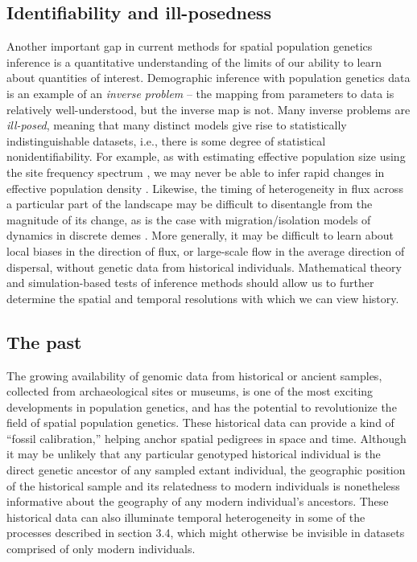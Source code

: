 \documentclass{ar-1col}
\renewcommand{\emph}[1]{{\textit{#1}}}
\begin{document}
\subsection{Identifiability and ill-posedness}

Another important gap in current methods for spatial population genetics inference 
is a quantitative understanding of the limits of our ability to learn about 
quantities of interest.
Demographic inference with population genetics data
is an example of an \emph{inverse problem} --
the mapping from parameters to data is relatively well-understood,
but the inverse map is not.
Many inverse problems are \emph{ill-posed},
meaning that many distinct models give rise to statistically indistinguishable datasets,
i.e., there is some degree of statistical nonidentifiability.
For example, 
as with estimating effective population size using the site frequency spectrum \citep{Myers2008},
we may never be able to infer rapid changes in effective population density
\citep[although see also][]{BhaskarSong2014descartes}.
Likewise, 
the timing of heterogeneity in flux across a particular part of the landscape 
may be difficult to disentangle from the magnitude of its change, 
as is the case with migration/isolation models 
of dynamics in discrete demes \citep{sousa2011nonidentifiability}.
More generally,
it may be difficult to learn about local biases in the direction of flux, 
or large-scale flow in the average direction of dispersal,
without genetic data from historical individuals.
Mathematical theory and simulation-based tests of inference methods
should allow us to further determine the spatial and temporal resolutions
with which we can view history.


\subsection{The past} 

The growing availability of genomic data from historical or ancient samples, 
collected from archaeological sites or museums,
is one of the most exciting developments in population genetics, 
and has the potential to revolutionize the field of spatial population genetics.
These historical data can provide a kind of ``fossil calibration,''
helping anchor spatial pedigrees in space and time.
Although it may be unlikely that any particular genotyped historical individual 
is the direct genetic ancestor of any sampled extant individual, 
the geographic position of the historical sample and its 
relatedness to modern individuals is nonetheless informative 
about the geography of any modern individual's ancestors.
These historical data can also illuminate temporal heterogeneity 
in some of the processes described in section 3.4, 
which might otherwise be invisible in datasets comprised of only modern individuals.
\end{document}
